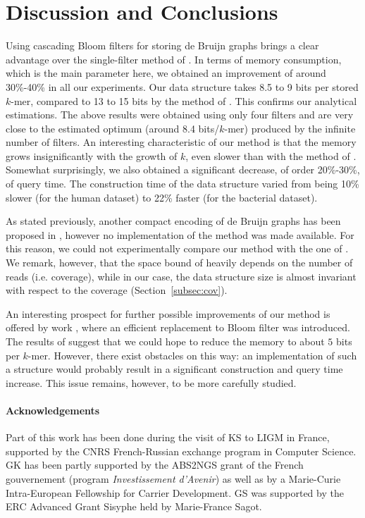 \documentclass[pdftex]{llncs}\usepackage[T1]{fontenc}
\begin{document}
\section{Discussion and Conclusions}
Using cascading Bloom filters for storing de Bruijn graphs brings a
clear advantage over the single-filter method of
\cite{DBLP:conf/wabi/ChikhiR12}. In terms of memory consumption, which
is the main parameter here, we obtained an improvement of around
30\%-40\% in all our experiments. Our data structure takes 8.5 to 9 bits
per stored $k$-mer, compared to 13 to 15 bits by the method of
\cite{DBLP:conf/wabi/ChikhiR12}. 
This confirms our analytical estimations. The above results were obtained using only
four filters and are very close to the estimated optimum (around 8.4
bits/$k$-mer) produced by the infinite number of filters. An
interesting characteristic of our method is that the memory grows insignificantly
with the growth of $k$, even slower than with the method of \cite{DBLP:conf/wabi/ChikhiR12}. 
Somewhat surprisingly, we also obtained a significant
decrease, of order 20\%-30\%, of query time. The construction time of
the data structure varied from being 10\% slower (for the human
dataset) to 22\% faster (for the bacterial dataset). 

As stated previously, another compact encoding of de Bruijn graphs has
been proposed in \cite{DBLP:conf/wabi/BoweOSS12}, however no
implementation of the method was made available. For this reason, we
could not experimentally compare our method with the one of
\cite{DBLP:conf/wabi/BoweOSS12}. We remark, however, that the space
bound of \cite{DBLP:conf/wabi/BoweOSS12} heavily depends on the number
of reads (i.e. coverage), while in our case, the data structure size
is almost invariant with respect to the coverage
(Section~\ref{subsec:cov}).

An interesting prospect for further possible improvements of our
method is offered by work \cite{DBLP:conf/csr/Porat09}, where an
efficient replacement to Bloom filter was introduced. The results of
\cite{DBLP:conf/csr/Porat09} suggest that we could hope to reduce the
memory to about $5$ bits per $k$-mer. However, 
there exist obstacles on this way: an implementation of such a
structure would probably result in a significant construction and query
time increase. This issue remains, however, to be more carefully studied. 


\paragraph{Acknowledgements} Part of this work has been done during
the visit of KS to LIGM in France, supported by the CNRS
French-Russian exchange program in Computer Science. GK has been
partly supported by the ABS2NGS grant of the French gouvernement
(program {\em Investissement d'Avenir}) as well as by a Marie-Curie
Intra-European Fellowship for Carrier Development. GS was supported by
the ERC Advanced Grant Sisyphe held by Marie-France Sagot.
\end{document}
